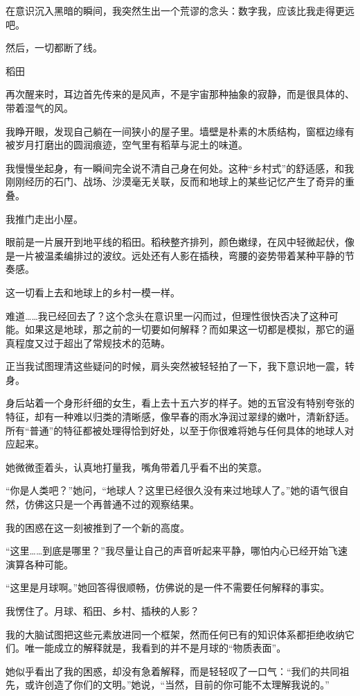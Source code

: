 在意识沉入黑暗的瞬间，我突然生出一个荒谬的念头：数字我，应该比我走得更远吧。

然后，一切都断了线。

稻田

再次醒来时，耳边首先传来的是风声，不是宇宙那种抽象的寂静，而是很具体的、带着湿气的风。

我睁开眼，发现自己躺在一间狭小的屋子里。墙壁是朴素的木质结构，窗框边缘有被岁月打磨出的圆润痕迹，空气里有稻草与泥土的味道。

我慢慢坐起身，有一瞬间完全说不清自己身在何处。这种“乡村式”的舒适感，和我刚刚经历的石门、战场、沙漠毫无关联，反而和地球上的某些记忆产生了奇异的重叠。

我推门走出小屋。

眼前是一片展开到地平线的稻田。稻秧整齐排列，颜色嫩绿，在风中轻微起伏，像是一片被温柔编排过的波纹。远处还有人影在插秧，弯腰的姿势带着某种平静的节奏感。

这一切看上去和地球上的乡村一模一样。

难道……我已经回去了？这个念头在意识里一闪而过，但理性很快否决了这种可能。如果这是地球，那之前的一切要如何解释？而如果这一切都是模拟，那它的逼真程度又过于超出了常规技术的范畴。

正当我试图理清这些疑问的时候，肩头突然被轻轻拍了一下，我下意识地一震，转身。

身后站着一个身形纤细的女生，看上去十五六岁的样子。她的五官没有特别夸张的特征，却有一种难以归类的清晰感，像早春的雨水净润过翠绿的嫩叶，清新舒适。所有“普通”的特征都被处理得恰到好处，以至于你很难将她与任何具体的地球人对应起来。

她微微歪着头，认真地打量我，嘴角带着几乎看不出的笑意。

“你是人类吧？”她问，“地球人？这里已经很久没有来过地球人了。”她的语气很自然，仿佛这只是一个再普通不过的观察结果。

我的困惑在这一刻被推到了一个新的高度。

“这里……到底是哪里？”我尽量让自己的声音听起来平静，哪怕内心已经开始飞速演算各种可能。

“这里是月球啊。”她回答得很顺畅，仿佛说的是一件不需要任何解释的事实。

我愣住了。月球、稻田、乡村、插秧的人影？

我的大脑试图把这些元素放进同一个框架，然而任何已有的知识体系都拒绝收纳它们。唯一能成立的解释就是，我看到的并不是月球的“物质表面”。

她似乎看出了我的困惑，却没有急着解释，而是轻轻叹了一口气：“我们的共同祖先，或许创造了你们的文明。”她说，“当然，目前的你可能不太理解我说的。”

